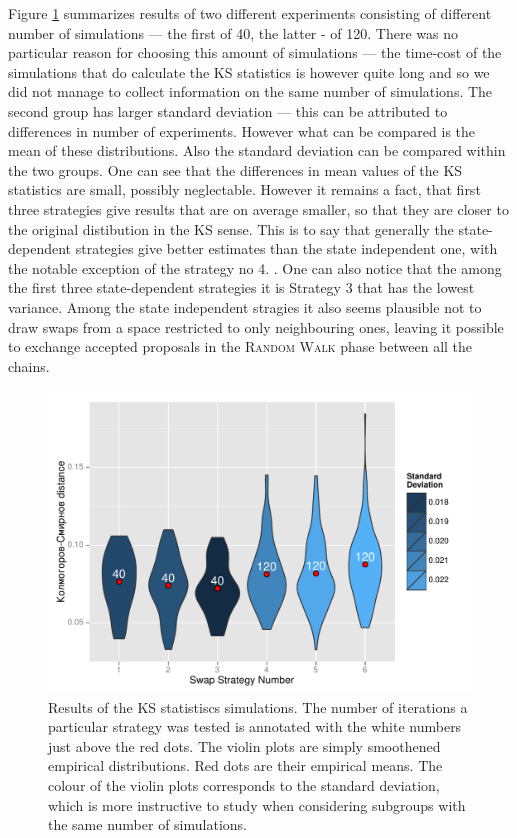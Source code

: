 \documentclass{book}
\begin{document}
Figure \ref{KSdistancePlot} summarizes results of two different experiments consisting of different number of simulations --- the first of 40, the latter - of 120. There was no particular reason for choosing this amount of simulations --- the time-cost of the simulations that do calculate the KS statistics is however quite long and so we did not manage to collect information on the same number of simulations. The second group has larger standard deviation --- this can be attributed to differences in number of experiments. However what can be compared is the mean of these distributions. Also the standard deviation can be compared within the two groups. One can see that the differences in mean values of the KS statistics are small, possibly neglectable. However it remains a fact, that first three strategies give results that are on average smaller, so that they are closer to the original distibution in the KS sense. This is to say that generally the state-dependent strategies give better estimates than the state independent one, with the notable exception of the strategy no 4. . One can also notice that the among the first three state-dependent strategies it is Strategy 3 that has the lowest variance. Among the state independent stragies it also seems plausible not to draw swaps from a space restricted to only neighbouring ones, leaving it possible to exchange accepted proposals in the \textsc{Random Walk} phase between all the chains.   



\begin{figure}[ht]
	\centering \includegraphics[width=\textwidth,keepaspectratio=TRUE]{./img/KSobs.pdf}
	\caption{Results of the KS statistiscs simulations. The number of iterations a particular strategy was tested is annotated with the white numbers just above the red dots. The violin plots are simply smoothened empirical distributions. Red dots are their empirical means. The colour of the violin plots corresponds to the standard deviation, which is more instructive to study when considering subgroups with the same number of simulations.}\label{KSdistancePlot}
\end{figure}
\end{document}
